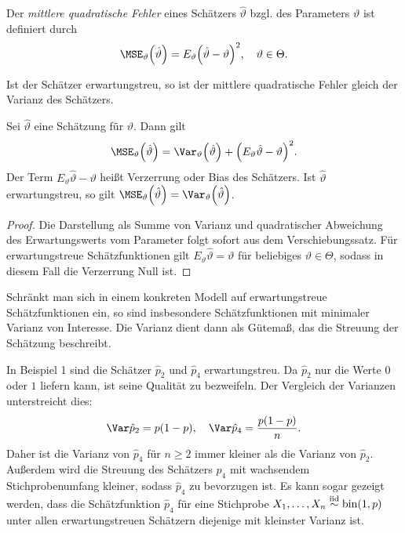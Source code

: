 \documentclass{lecture}
\begin{document}
    \begin{definition}
        Der \emph{mittlere quadratische Fehler} eines Schätzers \(\hat{\vartheta}\) bzgl. des Parameters \(\vartheta\) ist definiert durch
        \[
            \MSE_\vartheta\parentheses*{\hat{\vartheta}} = E_\vartheta\parentheses*{\hat{\vartheta} - \vartheta}^2, \quad \vartheta \in \Theta.
        \]
    \end{definition}

    Ist der Schätzer erwartungstreu, so ist der mittlere quadratische Fehler gleich der Varianz des Schätzers.

    \begin{theorem}
        Sei \(\hat{\vartheta}\) eine Schätzung für \(\vartheta\).
        Dann gilt
        \[
            \MSE_\vartheta\parentheses*{\hat{\vartheta}} = \Var_\vartheta\parentheses*{\hat{\vartheta}} + \parentheses*{E_\vartheta \hat{\vartheta} - \vartheta}^2.
        \]
        Der Term \(E_\vartheta \hat{\vartheta} - \vartheta\) heißt Verzerrung oder Bias des Schätzers.
        Ist \(\hat{\vartheta}\) erwartungstreu, so gilt \(\MSE_\vartheta\parentheses*{\hat{\vartheta}} = \Var_\vartheta\parentheses*{\hat{\vartheta}}\).
    \end{theorem}

    \begin{proof}
        Die Darstellung als Summe von Varianz und quadratischer Abweichung des Erwartungswerts vom Parameter folgt sofort aus dem Verschiebungssatz.
        Für erwartungstreue Schätzfunktionen gilt \(E_\vartheta \hat{\vartheta} = \vartheta\) für beliebiges \(\vartheta \in \Theta\), sodass in diesem Fall die Verzerrung Null ist.
    \end{proof}

    \begin{remark}
        Schränkt man sich in einem konkreten Modell auf erwartungstreue Schätzfunktionen ein, so sind insbesondere Schätzfunktionen mit minimaler Varianz von Interesse.
        Die Varianz dient dann als Gütemaß, das die Streuung der Schätzung beschreibt.
    \end{remark}

    \begin{example}
        In Beispiel 1 sind die Schätzer \(\hat{p}_2\) und \(\hat{p}_4\) erwartungstreu.
        Da \(\hat{p}_2\) nur die Werte \(0\) oder \(1\) liefern kann, ist seine Qualität zu bezweifeln.
        Der Vergleich der Varianzen unterstreicht dies:
        \[
            \Var\hat{p}_2 = p\parentheses*{1 - p}, \quad \Var\hat{p}_4 = \frac{p\parentheses*{1 - p}}{n}.
        \]
        Daher ist die Varianz von \(\hat{p}_4\) für \(n \ge 2\) immer kleiner als die Varianz von \(\hat{p}_2\).
        Außerdem wird die Streuung des Schätzers \(\hat{p}_4\) mit wachsendem Stichprobenumfang kleiner, sodass \(\hat{p}_4\) zu bevorzugen ist.
        Es kann sogar gezeigt werden, dass die Schätzfunktion \(\hat{p}_4\) für eine Stichprobe \(X_1, \ldots, X_n \stackrel{\text{iid}}{\sim} \bin\parentheses*{1, p}\) unter allen erwartungstreuen Schätzern diejenige mit kleinster Varianz ist.
    \end{example}
\end{document}
